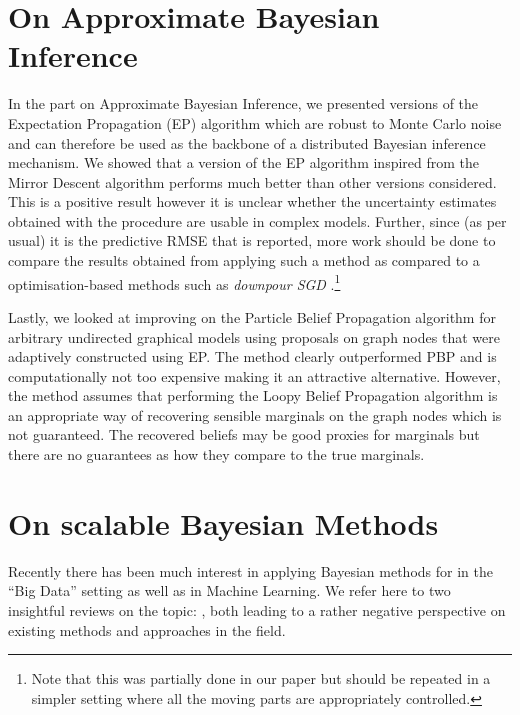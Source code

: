 \section{On Approximate Bayesian Inference}

In the part on Approximate Bayesian Inference, we presented versions of the Expectation Propagation (EP) algorithm which are robust to Monte Carlo noise and can therefore be used as the backbone of a distributed Bayesian inference mechanism. We showed that a version of the EP algorithm inspired from the Mirror Descent algorithm performs much better than other versions considered. This is a positive result however it is unclear whether the uncertainty estimates obtained with the procedure are usable in complex models. Further, since (as per usual) it is the predictive RMSE that is reported, more work should be done to compare the results obtained from applying such a method as compared to a optimisation-based methods such as \emph{downpour SGD} \citep{dean12}.\footnote{Note that this was partially done in our paper \citep{hasenclever16} but should be repeated in a simpler setting where all the moving parts are appropriately controlled.} 

Lastly, we looked at improving on the Particle Belief Propagation algorithm for arbitrary undirected graphical models using proposals on graph nodes that were adaptively constructed using EP. The method clearly outperformed PBP and is computationally not too expensive making it an attractive alternative. However, the method assumes that performing the Loopy Belief Propagation algorithm is an appropriate way of recovering sensible marginals on the graph nodes which is not guaranteed. The recovered beliefs may be good proxies for marginals but there are no guarantees as how they compare to the true marginals.

\section{On scalable Bayesian Methods}

Recently there has been much interest in applying Bayesian methods for in the ``Big Data'' setting as well as in Machine Learning. We refer here to two insightful reviews on the topic: \citet{green15, bardenet17}, both leading to a rather negative perspective on existing methods and approaches in the field. 

